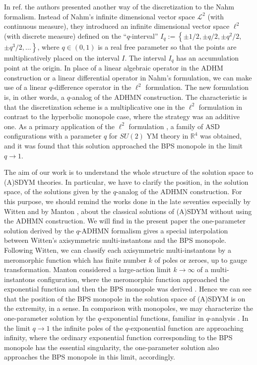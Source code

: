\documentclass[a4paper,10pt]{article}
\newcommand{\sutwo}{$SU(2)$ }
\begin{document}
In ref.\cite{KN} the authors presented another way of the discretization to the Nahm formalism.
Instead of Nahm's infinite dimensional vector space $\mathcal{L}^2$ (with continuous measure), they introduced an infinite dimensional vector space $\ell^2$ (with discrete measure) defined on the ``$q$-interval'' 
$I_q:=\left\{\pm1/2,\pm q/2,\pm q^2/2,\right.$ $\left.\pm q^3/2,\dots\right\}$, where $q \in (0,1)$ is a real free parameter so that the points are multiplicatively placed on the interval $I$.
The interval $I_q$ has an accumulation point at the origin.
In place of a linear algebraic operator in the ADHM construction or a linear differential operator in  Nahm's formulation, we can make use of a linear $q$-difference operator in the $\ell^2$ formulation.
The new formulation is, in other words, a $q$-analog of the ADHMN construction. 
The characteristic is that the discretization scheme is a multiplicative one in the $\ell^2$ formulation in contrast to the hyperbolic monopole case, where the strategy was an additive one.
As a primary application of the $\ell^2$ formulation \cite{KN}, a family of ASD configurations with a parameter $q$ for  \sutwo YM theory in  $\mathbb{R}^4$ was obtained, and it was found that this solution approached the BPS monopole in the limit $q \to 1$.


The aim of our work is to understand the whole structure of the solution space to (A)SDYM theories.
In particular, we have to clarify the position, in the solution space, of the solutions given by the $q$-analog of the ADHMN construction.
For this purpose, we should remind the works done in the late seventies especially by Witten \cite{W} and by Manton \cite{Mant},  about the classical solutions of (A)SDYM without using the ADHMN construction.
We will find in the present paper the one-parameter solution derived by the $q$-ADHMN formalism gives a special interpolation between Witten's axisymmetric multi-instantons and the BPS monopole.
Following Witten, we can classify each axisymmetric multi-instantons by a meromorphic function which has finite number $k$ of poles or zeroes, up to gauge transformation.
Manton \cite{Mant} considered a large-action limit $k \to \infty$ of a multi-instantons configuration, where the meromorphic function  approached the exponential function and then the BPS monopole was derived \cite{Mant}. 
Hence we can see that the position of the BPS monopole in the solution space of (A)SDYM is on the extremity, in a sense.
In comparison with monopoles, we may characterize the one-parameter solution by the $q$-exponential functions, familiar in $q$-analysis \cite{GR}.
In the limit $q \to 1$ the infinite poles of the $q$-exponential function are approaching infinity, where the ordinary exponential function corresponding to the BPS monopole has the essential singularity, the one-parameter solution also approaches the BPS monopole in this limit, accordingly. 
\end{document}

